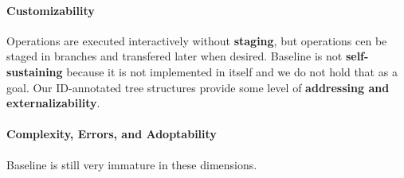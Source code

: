 \documentclass[english,submission]{programming}
\theoremstyle{definition}
\begin{document}
\paragraph{Customizability} Operations are executed interactively without \textbf{staging}, but operations cen be staged in branches and transfered later when desired. Baseline is not \textbf{self-sustaining} because it is not implemented in itself and we do not hold that as a goal. Our ID-annotated tree structures provide some level of \textbf{addressing and externalizability}.

\paragraph{Complexity, Errors, and Adoptability} Baseline is still very immature in these dimensions.





\printbibliography
\end{document}
